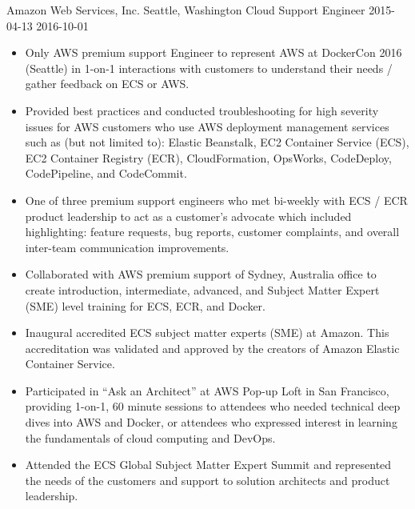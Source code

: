 \roleheader
    {Amazon Web Services, Inc.}
    {Seattle, Washington}
    {Cloud Support Engineer }
    {2015-04-13}
    {2016-10-01}

\begin{itemize} \itemsep 0pt
    \item Only AWS premium support Engineer to represent AWS at DockerCon 2016 (Seattle) in 1-on-1 interactions with customers to understand their needs / gather feedback on ECS or AWS.
    \item Provided best practices and conducted troubleshooting for high severity issues for AWS customers who use AWS deployment management services such as (but not limited to): Elastic Beanstalk, EC2 Container Service (ECS), EC2 Container Registry (ECR), CloudFormation, OpsWorks, CodeDeploy, CodePipeline, and CodeCommit.
    \item One of three premium support engineers who met bi-weekly with ECS / ECR product leadership to act as a customer's advocate which included highlighting: feature requests, bug reports, customer complaints, and overall inter-team communication improvements.
    \item Collaborated with AWS premium support of Sydney, Australia office to create introduction, intermediate, advanced, and Subject Matter Expert (SME) level training for ECS, ECR, and Docker.
    \item Inaugural accredited ECS subject matter experts (SME) at Amazon. This accreditation was validated and approved by the creators of Amazon Elastic Container Service. 
    \item Participated in ``Ask an Architect'' at AWS Pop-up Loft in San Francisco, providing 1-on-1, 60 minute sessions to attendees who needed technical deep dives into AWS and Docker, or attendees who expressed interest in learning the fundamentals of cloud computing and DevOps.
    \item Attended the ECS Global Subject Matter Expert Summit and represented the needs of the customers and support to solution architects and product leadership.
\end{itemize}
